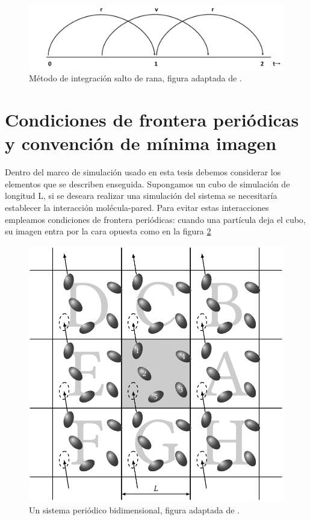 \begin{figure}[!h]
    \centering
    \includegraphics[width=.8\textwidth,keepaspectratio=true]{MD/leapfrogfig.png}
    \caption{Método de integración salto de rana, figura adaptada de \cite{gromacsdoc}.}
    \label{fig:leapfrog}
\end{figure}

\section{Condiciones de frontera periódicas y convención de mínima imagen}

Dentro del marco de simulación usado en esta tesis debemos considerar los elementos que se describen enseguida. Supongamos un cubo de simulación de longitud L, si se deseara realizar una simulación del sistema se necesitaría establecer la interacción molécula-pared. Para evitar estas interacciones empleamos condiciones de frontera periódicas: cuando una partícula deja el cubo, su imagen entra por la cara opuesta como en la figura \ref{fig:PBC}\\

\begin{figure}[!h]
    \centering
    \includegraphics[width=.7\textwidth,keepaspectratio=true]{PBC.png}
    \caption{Un sistema periódico bidimensional, figura adaptada de \cite{Allen2017}.}
    \label{fig:PBC}
\end{figure}

